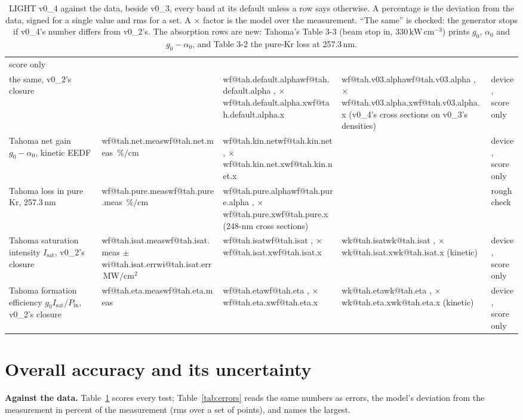 \documentclass[11pt]{article}
\makeatletter
\newcommand\wi[1]{\ifcsname wi@#1\endcsname\csname wi@#1\endcsname
  \else\errmessage{no v0_2 number '#1'. Rerun make_overview_v0_2.py}\fi}
\newcommand\wk[1]{\ifcsname wk@#1\endcsname\csname wk@#1\endcsname
  \else\errmessage{no v0_3 number '#1'. Rerun make_overview_v0_3.py}\fi}
\newcommand\wf[1]{\ifcsname wf@#1\endcsname\csname wf@#1\endcsname
  \else\errmessage{no v0_4 number '#1'. Rerun make_overview_v0_4.py}\fi}
\newcommand{\unit}[1]{\ensuremath{\,\mathrm{#1}}}
\newcommand{\gIP}{\ensuremath{g_0I_\mathrm{sat}/P_\mathrm{in}}}
\newcommand{\x}[1]{\ensuremath{\times}#1}
\makeatother
\begin{document}
\begin{table}[!tbp]
\begin{tabularx}{\linewidth}{@{}>{\raggedright\arraybackslash}X
  >{\raggedright\arraybackslash}p{2.3cm}>{\raggedright\arraybackslash}p{2.4cm}
  >{\raggedright\arraybackslash}p{2.3cm}>{\raggedright\arraybackslash}p{1.9cm}@{}}
  score only\\
\quad the same, v0\_2's closure & & \wf{tah.default.alpha},
  \x{\wf{tah.default.alpha.x}} & \wf{tah.v03.alpha}, \x{\wf{tah.v03.alpha.x}}
  (v0\_4's cross sections on v0\_3's densities) & device, score only\\
Tahoma net gain $g_0-\alpha_0$, kinetic EEDF & \wf{tah.net.meas}\unit{\%/cm}
  & \wf{tah.kin.net}, \x{\wf{tah.kin.net.x}} & & device, score only\\
Tahoma loss in pure Kr, 257.3\unit{nm} & \wf{tah.pure.meas}\unit{\%/cm} &
  \wf{tah.pure.alpha}, \x{\wf{tah.pure.x}} (248-nm cross sections) & &
  rough check\\
Tahoma saturation intensity $I_\mathrm{sat}$, v0\_2's closure &
  \wf{tah.isat.meas} $\pm$ \wi{tah.isat.err}\unit{MW/cm^2} & \wf{tah.isat},
  \x{\wf{tah.isat.x}} & \wk{tah.isat}, \x{\wk{tah.isat.x}} (kinetic) &
  device, score only\\
Tahoma formation efficiency \gIP, v0\_2's closure & \wf{tah.eta.meas} &
  \wf{tah.eta}, \x{\wf{tah.eta.x}} & \wk{tah.eta}, \x{\wk{tah.eta.x}}
  (kinetic) & device, score only\\
\bottomrule
\end{tabularx}
\caption{LIGHT v0\_4 against the data, beside v0\_3, every band at its
default unless a row says otherwise. A percentage is the deviation from
the data, signed for a single value and rms for a set. A \x{} factor is
the model over the measurement. ``The same'' is checked: the generator
stops if v0\_4's number differs from v0\_2's. The absorption rows are new:
Tahoma's Table 3-3 (beam stop in, 330\unit{kW\,cm^{-3}}) prints $g_0$,
$\alpha_0$ and $g_0-\alpha_0$, and Table 3-2 the pure-Kr loss at
257.3\unit{nm}.}
\label{tab:score}
\end{table}

\section{Overall accuracy and its uncertainty}
\label{sec:accuracy}

\textbf{Against the data.} Table~\ref{tab:score} scores every test;
Table~\ref{tab:errors} reads the same numbers as errors, the model's
deviation from the measurement in percent of the measurement (rms over a
set of points), and names the largest.
\end{document}
